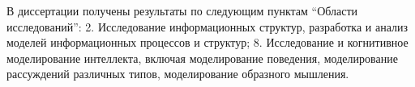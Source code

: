 \documentclass[a4paper]{report}
\begin{document}
В диссертации получены результаты по следующим пунктам ``Области исследований'': 2. Исследование информационных структур, разработка и анализ моделей информационных процессов и структур; 8. Исследование и когнитивное моделирование интеллекта, включая моделирование поведения, моделирование рассуждений различных типов, моделирование образного мышления. %



\end{document}
